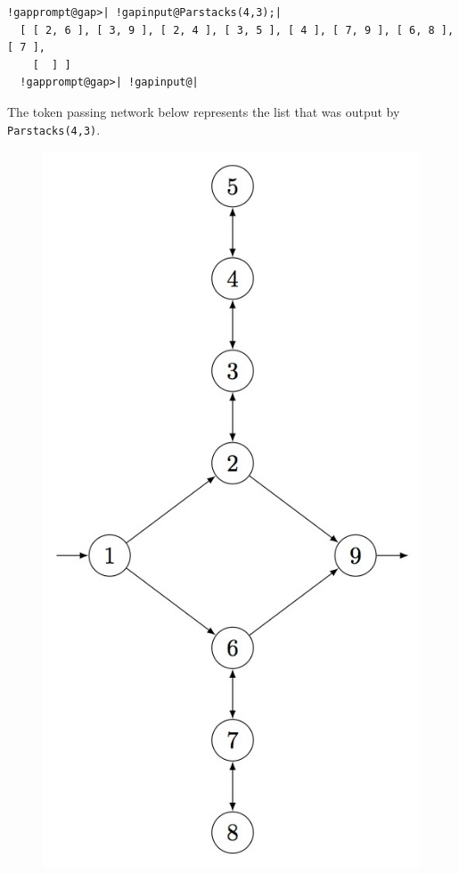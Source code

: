 \documentclass[a4paper,11pt]{report}
\begin{document}
{{{\begin{Verbatim}[commandchars=!@|,fontsize=\small,frame=single,label=Example]
  !gapprompt@gap>| !gapinput@Parstacks(4,3);|
  [ [ 2, 6 ], [ 3, 9 ], [ 2, 4 ], [ 3, 5 ], [ 4 ], [ 7, 9 ], [ 6, 8 ], [ 7 ],
    [  ] ]
  !gapprompt@gap>| !gapinput@|
\end{Verbatim}
 
      The token passing network below represents the list that was output by \texttt{Parstacks(4,3)}.
      \begin{figure}[H] \begin{center} \leavevmode \includegraphics[scale=0.75]{img/ps43.jpg} \end{center} \end{figure}
      }

}}
\end{document}
